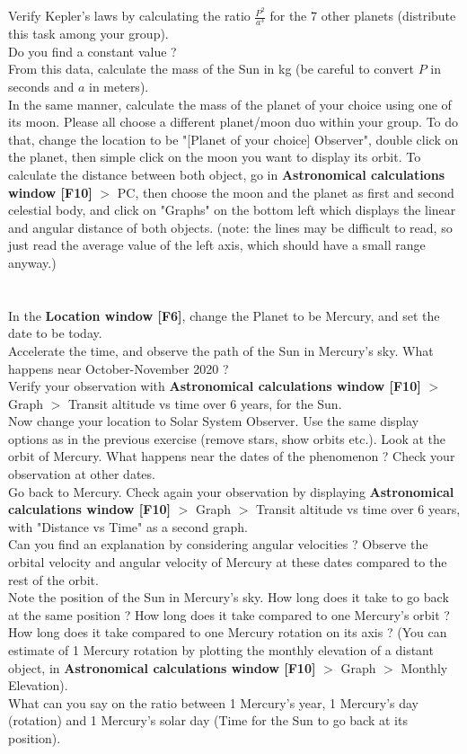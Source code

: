 \documentclass{article}
\begin{document}
Verify Kepler's laws by calculating the ratio $\frac{P^2}{a^3}$ for the 7 other planets (distribute this task among your group).\\
Do you find a constant value ?\\
From this data, calculate the mass of the Sun in kg (be careful to convert $P$ in seconds and $a$ in meters).\\
In the same manner, calculate the mass of the planet of your choice using one of its moon. Please all choose a different planet/moon duo within your group. To do that, change the location to be "[Planet of your choice] Observer", double click on the planet, then simple click on the moon you want to display its orbit. To calculate the distance between both object, go in \textbf{Astronomical calculations window [F10]} $>$ PC, then choose the moon and the planet as first and second celestial body, and click on "Graphs" on the bottom left which displays the linear and angular distance of both objects. (note: the lines may be difficult to read, so just read the average value of the left axis, which should have a small range anyway.)\\


\section{}

In the \textbf{Location window [F6]}, change the Planet to be Mercury, and set the date to be today.\\
Accelerate the time, and observe the path of the Sun in Mercury's sky. What happens near October-November 2020 ?\\
Verify your observation with \textbf{Astronomical calculations window [F10]} $>$ Graph $>$ Transit altitude vs time over 6 years, for the Sun.\\
Now change your location to Solar System Observer. Use the same display options as in the previous exercise (remove stars, show orbits etc.). Look at the orbit of Mercury. What happens near the dates of the phenomenon ? Check your observation at other dates.\\
Go back to Mercury. Check again your observation by displaying \textbf{Astronomical calculations window [F10]} $>$ Graph $>$ Transit altitude vs time over 6 years, with "Distance vs Time" as a second graph.\\
Can you find an explanation by considering angular velocities ? Observe the orbital velocity and angular velocity of Mercury at these dates compared to the rest of the orbit.\\
Note the position of the Sun in Mercury's sky. How long does it take to go back at the same position ? How long does it take compared to one Mercury's orbit ? How long does it take compared to one Mercury rotation on its axis ? (You can estimate of 1 Mercury rotation by plotting the monthly elevation of a distant object, in \textbf{Astronomical calculations window [F10]} $>$ Graph $>$ Monthly Elevation).\\
What can you say on the ratio between 1 Mercury's year, 1 Mercury's day (rotation) and 1 Mercury's solar day (Time for the Sun to go back at its position).
\end{document}

